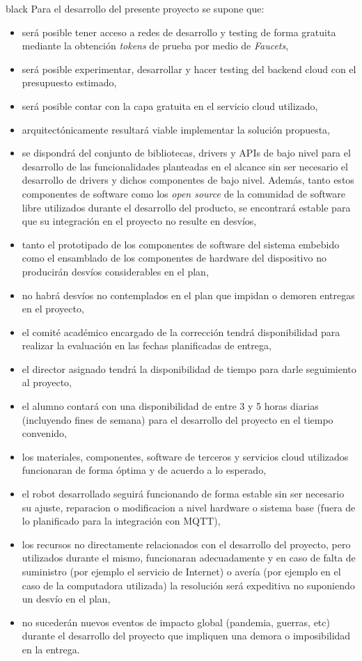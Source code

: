 \documentclass[
11pt, %
]{charter}
\begin{document}
\begin{consigna}{black}
Para el desarrollo del presente proyecto se supone que:

\begin{itemize}
	\item será posible tener acceso a redes de desarrollo y testing de forma gratuita mediante la obtención \textit{tokens} de prueba por medio de \textit{Faucets},
	\item será posible experimentar, desarrollar y hacer testing del backend cloud con el presupuesto estimado,
	\item será posible contar con la capa gratuita en el servicio cloud utilizado,
	\item arquitectónicamente resultará viable implementar la solución propuesta,
	\item se dispondrá del conjunto de bibliotecas, drivers y APIs de bajo nivel para el desarrollo de las funcionalidades planteadas en el alcance sin ser necesario el desarrollo de drivers y dichos componentes de bajo nivel. Además, tanto estos componentes de software como los  \textit{open source} de la comunidad de software libre utilizados durante el desarrollo del producto, se encontrará estable para que su integración en el proyecto no resulte en desvíos,	
	\item tanto el prototipado de los componentes de software del sistema embebido como el ensamblado de los componentes de hardware del dispositivo no producirán desvíos considerables en el plan,
	\item no habrá desvíos no contemplados en el plan que impidan o demoren entregas en el proyecto,
	\item el comité académico encargado de la corrección tendrá disponibilidad para realizar la evaluación en las fechas planificadas de entrega,
	\item el director asignado tendrá la disponibilidad de tiempo para darle seguimiento al proyecto,
	\item el alumno contará con una disponibilidad de entre 3 y 5 horas diarias (incluyendo fines de semana) para el desarrollo del proyecto en el tiempo convenido,
	\item los materiales, componentes, software de terceros y servicios cloud utilizados funcionaran de forma óptima y de acuerdo a lo esperado,
	\item el robot desarrollado seguirá funcionando de forma estable sin ser necesario su ajuste, reparacion o modificacion a nivel hardware o sistema base (fuera de lo planificado para la integración con MQTT),
	\item los recursos no directamente relacionados con el desarrollo del proyecto, pero utilizados durante el mismo, funcionaran adecuadamente y en caso de falta de suministro (por ejemplo el servicio de Internet) o avería (por ejemplo en el caso de la computadora utilizada) la resolución será expeditiva no suponiendo un desvío en el plan,
	\item no sucederán nuevos eventos de impacto global (pandemia, guerras, etc) durante el desarrollo del proyecto que impliquen una demora o imposibilidad en la entrega.
\end{itemize}



\end{consigna}
\end{document}

